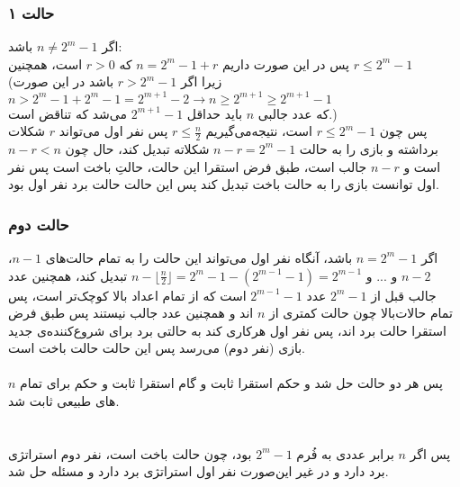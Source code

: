 \documentclass[12pt,a4paper]{article}
\begin{document}
\subsubsection*{حالت ۱}
اگر 
$n \neq 2^m-1$
باشد:
\\
پس در این صورت داریم
$n = 2^m - 1 + r$
که $r > 0$ است، همچنین 
$r \leq 2^m-1$
\\
(زیرا اگر 
$r > 2^m-1$
باشد در این صورت
\\
$n > 2^m-1 + 2^m-1 = 2^{m+1}-2 \rightarrow n \geq 2^{m+1} \geq 2^{m+1}-1$
\\
که عدد جالبی $n$ باید حداقل $2^{m+1}-1$ می‌شد که تناقض است.)
\\
پس چون 
$r \leq 2^m-1$
است، نتیجه‌می‌گیریم 
$r \leq \frac{n}{2}$
پس نفر اول می‌تواند $r$ شکلات برداشته و بازی را به حالت $n-r = 2^m-1$ شکلاته تبدیل کند، حال چون $n-r < n$ است و $n-r$ جالب است، طبق فرض استقرا این حالت، حالتِ باخت است پس نفر اول توانست بازی را به حالت باخت تبدیل کند پس این حالت حالت برد نفر اول بود.
\subsubsection*{حالت دوم}
اگر $n=2^m-1$ باشد، آنگاه نفر اول می‌تواند این حالت را به تمام حالت‌های $n-1$، $n-2$ و ... و 
$n - \lfloor\frac{n}{2}\rfloor = 2^m-1 - (2^{m-1}-1) = 2^{m-1}$
تبدیل کند، همچنین عدد جالب قبل از $2^m-1$ عدد $2^{m-1}-1$ است که از تمام اعداد بالا کوچک‌تر است، پس تمام حالات‌بالا چون حالت کمتری از $n$ اند و همچنین عدد جالب نیستند پس طبق فرض استقرا حالت برد اند، پس نفر اول هرکاری کند به حالتی برد برای شروع‌کننده‌ی جدید بازی (نفر دوم) می‌رسد پس این حالت حالت باخت است.
\\
\\
پس هر دو حالت حل شد و حکم استقرا ثابت و گام استقرا ثابت و حکم برای تمام $n$ های طبیعی ثابت شد.
\\
\\
\\
پس اگر $n$ برابر عددی به فُرم 
$2^m - 1$
بود، چون حالت باخت است، نفر دوم استراتژی برد دارد و در غیر این‌صورت نفر اول استراتژی برد دارد و مسئله حل شد.
\end{document}
